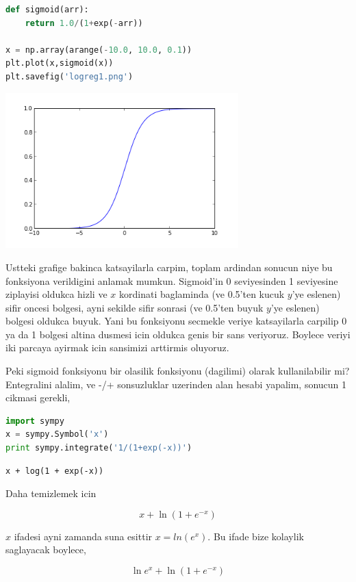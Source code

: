 \documentclass[12pt,fleqn]{article}\usepackage{../common}
\begin{document}
\begin{lstlisting}[language=Python]
%pylab inline
def sigmoid(arr):
    return 1.0/(1+exp(-arr))

x = np.array(arange(-10.0, 10.0, 0.1))
plt.plot(x,sigmoid(x))
plt.savefig('logreg1.png')
\end{lstlisting}

\includegraphics[height=6cm]{logreg1.png}

Ustteki grafige bakinca katsayilarla carpim, toplam ardindan sonucun
niye bu fonksiyona verildigini anlamak mumkun. Sigmoid'in 0
seviyesinden 1 seviyesine ziplayisi oldukca hizli ve $x$ kordinati
baglaminda (ve 0.5'ten kucuk $y$'ye eslenen) sifir oncesi bolgesi,
ayni sekilde sifir sonrasi (ve 0.5'ten buyuk $y$'ye eslenen) bolgesi
oldukca buyuk. Yani bu fonksiyonu secmekle veriye katsayilarla
carpilip 0 ya da 1 bolgesi altina dusmesi icin oldukca genis bir sans
veriyoruz.  Boylece veriyi iki parcaya ayirmak icin sansimizi
arttirmis oluyoruz.


Peki sigmoid fonksiyonu bir olasilik fonksiyonu (dagilimi) olarak
kullanilabilir mi?  Entegralini alalim, ve -/+ sonsuzluklar uzerinden
alan hesabi yapalim, sonucun 1 cikmasi gerekli,

\begin{lstlisting}[language=Python]
import sympy
x = sympy.Symbol('x')
print sympy.integrate('1/(1+exp(-x))')
\end{lstlisting}

\begin{verbatim}
x + log(1 + exp(-x))
\end{verbatim}

Daha temizlemek icin

$$ x + \ln(1 + e^{-x}) $$

$x$ ifadesi ayni zamanda suna esittir $x=ln( e^{x} )$. Bu ifade bize
kolaylik saglayacak boylece,

$$ \ln e^{x} + \ln(1+e^{-x})  $$
\end{document}
